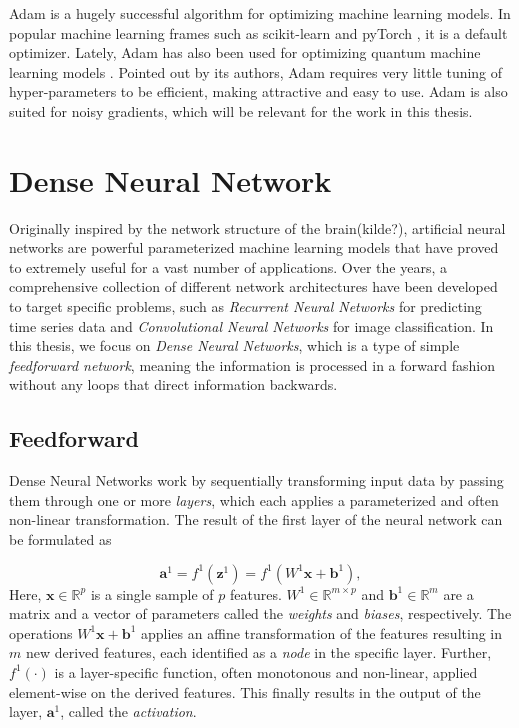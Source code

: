 Adam is a hugely successful algorithm for optimizing machine learning models. In popular machine learning frames such as scikit-learn \cite{scikit-learn} and pyTorch \cite{NEURIPS2019_9015}, it is a default optimizer. Lately, Adam has also been used for optimizing quantum machine learning models \cite{abbas2020power} \cite{skolik2020layerwise}. Pointed out by its authors, Adam requires very little tuning of hyper-parameters to be efficient, making attractive and easy to use. Adam is also suited for noisy gradients, which will be relevant for the work in this thesis. 



\section{Dense Neural Network}\label{sec:DenseNeuralNetwork}
Originally inspired by the network structure of the brain(kilde?), artificial neural networks are powerful parameterized machine learning models that have proved to extremely useful for a vast number of applications. Over the years, a comprehensive collection of different network architectures have been developed to target specific problems, such as \emph{Recurrent Neural Networks} for predicting time series data and \emph{Convolutional Neural Networks} for image classification. In this thesis, we focus on \emph{Dense Neural Networks}, which is a type of simple \emph{feedforward network}, meaning the information is processed in a forward fashion without any loops that direct information backwards.

\subsection{Feedforward}\label{sec:FeedforwardDNN}
Dense Neural Networks work by sequentially transforming input data by passing them through one or more \emph{layers}, which each applies a parameterized and often non-linear transformation. The result of the first layer of the neural network can be formulated as

\begin{equation}\label{eq:FeedforwardSingle}
    \boldsymbol{a}^1 = f^1(\boldsymbol{z}^1) = f^1(W^1 \boldsymbol{x} + \boldsymbol{b}^1),
\end{equation}
Here, $\boldsymbol{x} \in \mathbb{R}^p$ is a single sample of $p$ features. $W^1 \in \mathbb{R}^{m \times p}$ and $\boldsymbol{b}^1 \in \mathbb{R}^{m}$ are a matrix and a vector of parameters called the \emph{weights} and \emph{biases}, respectively. The operations $W^1 \boldsymbol{x} + \boldsymbol{b}^1$ applies an affine transformation of the features resulting in $m$ new derived features, each identified as a \emph{node} in the specific layer. Further, $f^1(\cdot)$ is a layer-specific function, often monotonous and non-linear, applied element-wise on the derived features. This finally results in the output of the layer, $\boldsymbol{a}^1$, called the \emph{activation}.

